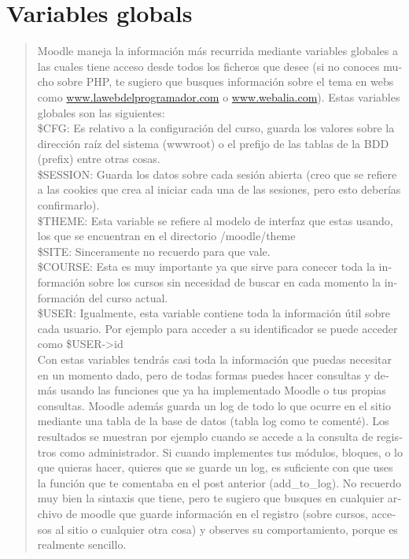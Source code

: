 \documentclass[a4paper]{report}  %
\begin{document}
\section{Variables globals}\label{annexvariablesglobals}
\begin{otherlanguage}{spanish}
\begin{quote}
Moodle maneja la información más recurrida mediante variables globales a las cuales tiene acceso desde todos los ficheros que desee (si no conoces mucho sobre PHP, te sugiero que busques información sobre el tema en webs como \url{www.lawebdelprogramador.com} o \url{www.webalia.com}). Estas variables globales son las siguientes:\\
\$CFG: Es relativo a la configuración del curso, guarda los valores sobre la dirección raíz del sistema (wwwroot) o el prefijo de las tablas de la BDD (prefix) entre otras cosas.\\ 
\$SESSION: Guarda los datos sobre cada sesión abierta (creo que se refiere a las cookies que crea al iniciar cada una de las sesiones, pero esto deberías confirmarlo).\\
\$THEME: Esta variable se refiere al modelo de interfaz que estas usando, los que se encuentran en el directorio /moodle/theme\\
\$SITE: Sinceramente no recuerdo para que vale.\\
\$COURSE: Esta es muy importante ya que sirve para conecer toda la información sobre los cursos sin necesidad de buscar en cada momento la información del curso actual.\\
\$USER: Igualmente, esta variable contiene toda la información útil sobre cada usuario. Por ejemplo para acceder a su identificador se puede acceder como \$USER->id\\
Con estas variables tendrás casi toda la información que puedas necesitar en un momento dado, pero de todas formas puedes hacer consultas y demás usando las funciones que ya ha implementado Moodle o tus propias consultas.
Moodle además guarda un log de todo lo que ocurre en el sitio mediante una tabla de la base de datos (tabla log como te comenté). Los resultados se muestran por ejemplo cuando se accede a la consulta de registros como administrador. 
Si cuando implementes tus módulos, bloques, o lo que quieras hacer, quieres que se guarde un log, es suficiente con que uses la función que te comentaba en el post anterior (add\_to\_log). No recuerdo muy bien la sintaxis que tiene, pero te sugiero que busques en cualquier archivo de moodle que guarde información en el registro (sobre cursos, accesos al sitio o cualquier otra cosa) y observes su comportamiento, porque es realmente sencillo.
\end{quote} 
\end{otherlanguage}
\end{document}
